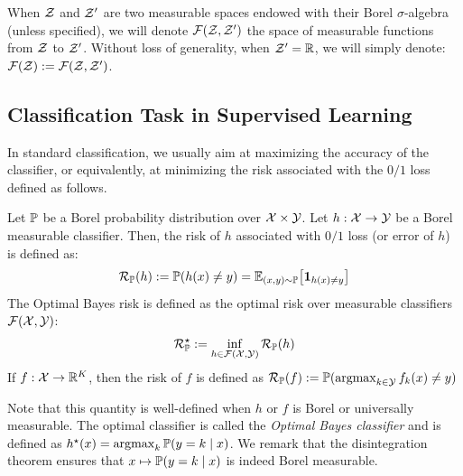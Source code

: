 When $\mathcal{Z}$ and $\mathcal{Z}'$ are two measurable spaces endowed with their Borel $\sigma$-algebra (unless specified), we will denote $\mathcal{F}(\mathcal{Z},\mathcal{Z}')$ the space of measurable functions from $\mathcal{Z}$ to $\mathcal{Z}'$. Without loss of generality, when $\mathcal{Z}'=\mathbb{R}$, we will simply denote: $\mathcal{F}(\mathcal{Z}):=\mathcal{F}(\mathcal{Z},\mathcal{Z}')$.




\subsection{Classification Task in Supervised Learning}


In standard classification, we usually aim at maximizing the accuracy of the classifier, or equivalently, at minimizing the risk associated with the $0/1$ loss defined as follows.

    
\begin{definition} Let $\mathbb{P}$ be a Borel probability distribution over $\mathcal{X}\times\mathcal{Y}$. Let $h:\mathcal{X}\to\mathcal{Y}$ be a Borel measurable classifier. Then, the risk of $h$ associated with $0/1$ loss (or error of $h$) is defined as:
\begin{align}
   \risk_{\PP}(h):=\PP(h(x)\neq y) = \EE_{(x,y)\sim\PP}\left[\mathbf{1}_{h(x)\neq y}\right]
\end{align}
The Optimal Bayes risk is defined as the optimal risk over measurable classifiers $\mathcal{F}(\mathcal{X},\mathcal{Y})$:
\begin{align}
    \mathcal{R}^\star_{\mathbb{P}}:=\inf_{h\in\mathcal{F}(\mathcal{X},\mathcal{Y})}\mathcal{R}_{\mathbb{P}}(h)
 \end{align}
If $f:\mathcal{X}\to\mathbb{R}^K$, then the risk of $f$ is defined as $\mathcal{R}_{\mathbb{P}}(f):=\mathbb{P}(\operatorname*{argmax}_{k\in\mathcal{Y}}f_k(x)\neq y)$
\end{definition}
Note that this quantity is well-defined when $h$ or $f$ is Borel or universally measurable. The optimal classifier is called the \emph{Optimal Bayes  classifier} and is defined as $h^\star(x) = \operatorname*{argmax}_k\mathbb{P}(y=k\mid x)$. We remark that the disintegration theorem ensures that $x\mapsto \mathbb{P}(y=k\mid x)$ is indeed Borel measurable. 

